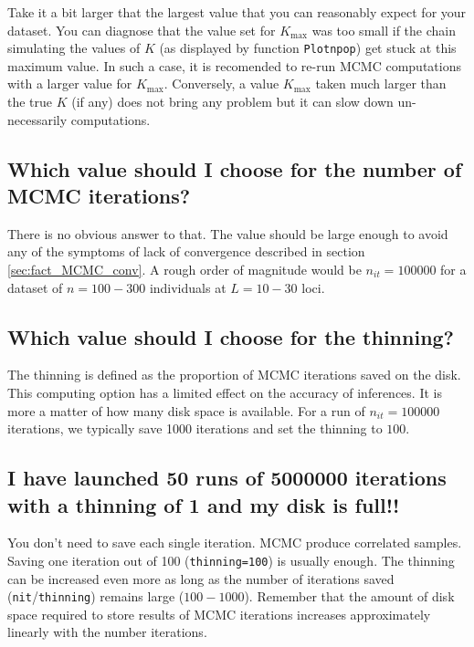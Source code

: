 \documentclass[a4paper,10pt]{article}
\begin{document}
Take it a bit larger that the largest value that you can reasonably expect for your dataset. 
You can diagnose that the value set for $K_{\max}$ was too small if the chain simulating the values of $K$ (as displayed by function \texttt{Plotnpop})  
get stuck at this maximum value. In such a case, it is recomended to re-run MCMC computations with a larger value for $K_{\max}$.
Conversely, a value $K_{\max}$ taken much larger than the true $K$ (if any) does not bring any problem 
but it can slow down un-necessarily computations. 

\subsection[Number of iterations]{Which value should I choose for the number of MCMC iterations?}\label{sec:faqnit}
There is no obvious answer to that. The value should be large enough to avoid any of the symptoms of 
lack of convergence described in section \ref{sec:fact_MCMC_conv}. 
A rough order of magnitude would be $n_{it}=100000$ for a dataset of $n=100-300$ individuals at $L=10-30$ loci. 

\subsection[MCMC thinning]{Which value should I choose for the thinning?}\label{sec:faqthinning}
The thinning is defined as the proportion of MCMC iterations saved on the disk. 
This computing option has a limited effect on the accuracy of inferences. It is more a matter of how many disk space is available. 
For a run of  $n_{it}=100000$ iterations, we typically save 1000 iterations and set the thinning to $100$.  

\subsection[Storage]{I have launched 50 runs of  5000000 iterations with a thinning of 1 and my disk is full!!}

You don't need to save each single iteration. MCMC produce correlated samples. Saving one iteration out of 100 (\texttt{thinning=100}) 
is usually enough. 
The thinning can be increased even more as long as the number of iterations saved (\texttt{nit}/\texttt{thinning}) remains large ($100-1000$).
Remember that the amount of disk space required to store results of MCMC iterations increases approximately  linearly with the number iterations. 
\end{document}
